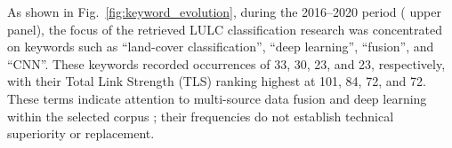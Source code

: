 \documentclass[]{interact}
\theoremstyle{plain}%
\theoremstyle{definition}
\theoremstyle{remark}
\DeclareRobustCommand{\DIFadd}[1]{{\protect\color{DIFaddcolor}\uwave{#1}}}
\DeclareRobustCommand{\DIFdel}[1]{{\protect\color{DIFdelcolor}\sout{#1}}}
\def\DIFadd#1{#1}%
\def\DIFdel#1{}%
\begin{document}
As shown in Fig.~\ref{fig:keyword_evolution}, during the 2016--2020 period (\DIFdel{left} \DIFdel{portion} \DIFdel{of} \DIFdel{the} \DIFdel{network}\hspace{0.33em}\DIFadd{upper} \DIFadd{panel}), the focus of \DIFadd{the} \DIFadd{retrieved} LULC \DIFdel{simulation} \DIFadd{classification} research was concentrated on keywords such as ``\DIFdel{land-classification''}\DIFadd{land-cover} \DIFadd{classification''}, ``deep learning'', ``fusion'', and ``CNN''. These keywords recorded occurrences of 33, 30, 23, and 23, respectively, with their Total Link Strength (TLS) ranking highest at 101, 84, 72, and 72. \DIFdel{This} \DIFdel{indicates} \DIFdel{that} \DIFdel{the} \DIFdel{academic} \DIFdel{community} \DIFdel{during} \DIFdel{this} \DIFdel{stage} \DIFdel{began} \DIFadd{These} \DIFadd{terms} \DIFadd{indicate} \DIFadd{attention} to \DIFdel{extensively} \DIFdel{integrate} multi-source data fusion \DIFdel{with} \DIFadd{and} deep learning \DIFdel{architectures} {\hypersetup{citecolor=red}\color{red}\citep{23}}\DIFdel{,} \DIFdel{witnessing} \DIFadd{within} the \DIFdel{evolution} \DIFdel{of} \DIFdel{LULC} \DIFdel{research} \DIFdel{into} \DIFdel{a} \DIFdel{multi-disciplinary} \DIFdel{intersection} {\hypersetup{citecolor=red}\color{red}\citep{ORIG6}} \DIFadd{selected} \DIFadd{corpus} {\color{blue}\citep{23,6}}\DIFadd{;} \DIFadd{their} \DIFadd{frequencies} \DIFadd{do} \DIFadd{not} \DIFadd{establish} \DIFadd{technical} \DIFadd{superiority} \DIFadd{or} \DIFadd{replacement}.
\end{document}
